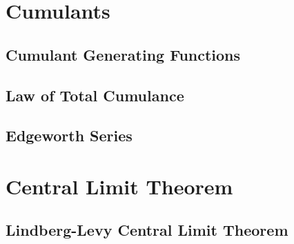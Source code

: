 \documentclass[11pt]{report} %
\begin{document}
\section{Cumulants}

\subsection{Cumulant Generating Functions}

\subsection{Law of Total Cumulance}

\subsection{Edgeworth Series}

\section{Central Limit Theorem}

\subsection{Lindberg-Levy Central Limit Theorem}
\end{document}
